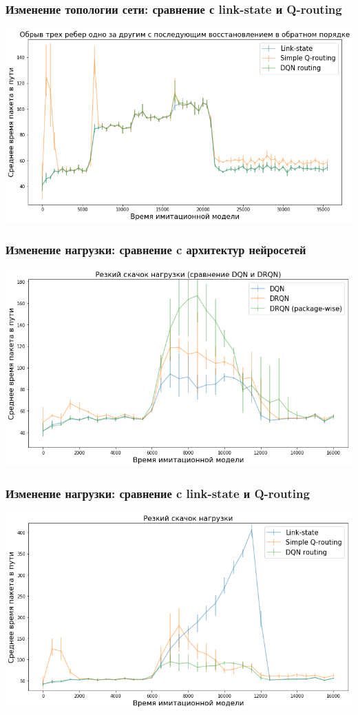 \documentclass{beamer}
\begin{document}

\begin{frame}
  \frametitle{Изменение топологии сети: сравнение с link-state и Q-routing}
  \includegraphics[width=\textwidth]{experiment-link-failures} 
\end{frame}


\begin{frame}
  \frametitle{Изменение нагрузки: сравнение c архитектур нейросетей}
  \includegraphics[width=\textwidth]{experiment-rnn-comparison} 
\end{frame}


\begin{frame}
  \frametitle{Изменение нагрузки: сравнение c link-state и Q-routing}
  \includegraphics[width=\textwidth]{experiment-peak-load} 
\end{frame}
\end{document}
